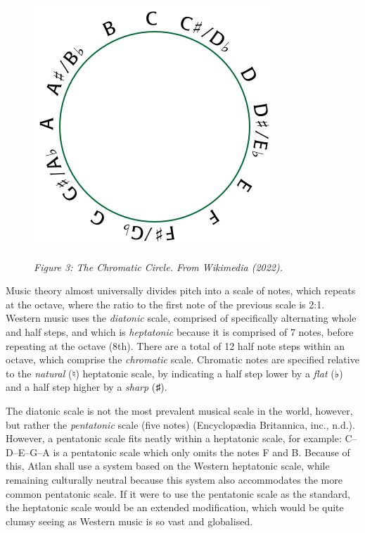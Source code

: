 \begin{figure}
\includegraphics[scale=0.35]{./Images/pitch.jpg}

{\it \footnotesize Figure 3: The Chromatic Circle. From Wikimedia (2022).}

\end{figure}

\noindent Music theory almost universally divides pitch into a scale of notes, which repeats at the octave, where the ratio to the first note of the previous scale is 2:1. Western music uses the \textit{diatonic} scale, comprised of specifically alternating whole and half steps, and which is \textit{heptatonic} because it is comprised of 7 notes, before repeating at the octave (8th). There are a total of 12 half note steps within an octave, which comprise the \textit{chromatic} scale. Chromatic notes are specified relative to the \textit{natural} (♮) heptatonic scale, by indicating a half step lower by a \textit{flat} (♭) and a half step higher by a \textit{sharp}  (♯). 



The diatonic scale is not the most prevalent musical scale in the world, however, but rather the \textit{pentatonic} scale (five notes) (Encyclop\ae dia Britannica, inc., n.d.). However, a pentatonic scale fits neatly within a heptatonic scale, for example: C–D–E–G–A is a pentatonic scale which only omits the notes F and B. Because of this, Atlan shall use a system based on the Western heptatonic scale, while remaining culturally neutral because this system also accommodates the more common pentatonic scale. If it were to use the pentatonic scale as the standard, the heptatonic scale would be an extended modification, which would be quite clumsy seeing as Western music is so vast and globalised. 

